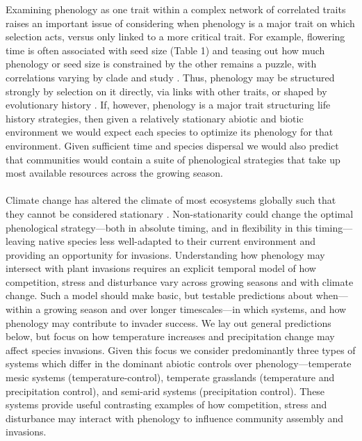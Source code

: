 \documentclass[11pt,a4paper,oneside]{article}
\begin{document}
Examining phenology as one trait within a complex network of correlated traits raises an important issue of considering when phenology is a major trait on which selection acts, versus only linked to a more critical trait. For example, flowering time is often associated with seed size (Table 1) and teasing out how much phenology or seed size is constrained by the other remains a puzzle, with correlations varying by clade and study \citep{Mazer:1989in,Bolmgren:2008vo}. Thus, phenology may be structured strongly by selection on it directly, via links with other traits, or shaped by evolutionary history \citep[see][and see below]{Lechowicz:1984cr,Ollerton:1992kf}. If, however, phenology is a major trait structuring life history strategies, then given a relatively stationary abiotic and biotic environment we would expect each species to optimize its phenology for that environment. Given sufficient time and species dispersal we would also predict that communities would contain a suite of phenological strategies that take up most available resources across the growing season.\\

\\
\noindent Climate change has altered the climate of most ecosystems globally such that they cannot be considered stationary \citep[that is, to have consistent climate means with some stochastic variation around those means, see][]{julio2012}. Non-stationarity could change the optimal phenological strategy---both in absolute timing, and in flexibility in this timing---leaving native species less well-adapted to their current environment and providing an opportunity for invasions. Understanding how phenology may intersect with plant invasions requires an explicit temporal model of how competition, stress and disturbance vary across growing seasons and with climate change. Such a model should make basic, but testable predictions about when---within a growing season and over longer timescales---in which systems, and how phenology may contribute to invader success. We lay out general predictions below, but focus on how temperature increases and precipitation change may affect species invasions. Given this focus we consider predominantly three types of systems which differ in the dominant abiotic controls over phenology---temperate mesic systems (temperature-control), temperate grasslands (temperature and precipitation control), and semi-arid systems (precipitation control). These systems provide useful contrasting examples of how competition, stress and disturbance may interact with phenology to influence community assembly and invasions. %
\end{document}
